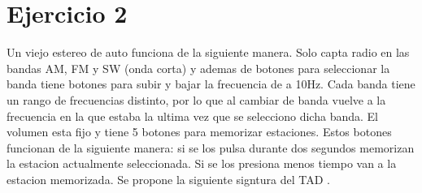 \documentclass[10pt,a4paper]{article}
\begin{document}
\section{Ejercicio 2}

Un viejo estereo de auto funciona de la siguiente manera. Solo capta radio en las bandas AM, FM y SW (onda corta) y ademas de botones para seleccionar la banda tiene botones para subir y bajar la frecuencia de a 10Hz. Cada banda tiene un rango de frecuencias distinto, por lo que al cambiar de banda vuelve a la frecuencia en la que estaba la ultima vez que se selecciono dicha banda. El volumen esta fijo y tiene 5 botones para memorizar estaciones. Estos botones funcionan de la siguiente manera: si se los pulsa durante dos segundos memorizan la estacion actualmente seleccionada. Si se los presiona menos tiempo van a la estacion memorizada. Se propone la siguiente signtura del TAD .
\newline
\newline
\begin{tad}{}
	\medskip	
	\tadObservadores
	\medskip
	\medskip
	\medskip
	
	\tadGeneradores
	\medskip
	\medskip
	\medskip
	\medskip
	\medskip
	\medskip
	\medskip
	
	\tadAxiomas[$\forall$]
	
	\medskip
	\medskip
	\medskip
	\medskip

\end{tad}
\end{document}
